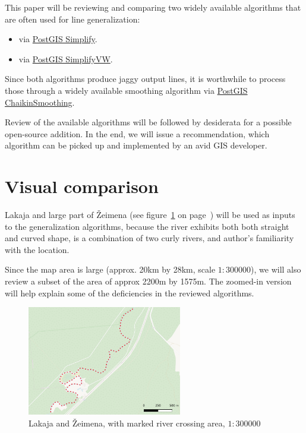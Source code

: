 \documentclass[a4paper]{article}
\begin{document}
This paper will be reviewing and comparing two widely available algorithms that
are often used for line generalization:
\begin{itemize}
    \item \cite{douglas1973algorithms} via
        \href{https://postgis.net/docs/ST_Simplify.html}{PostGIS Simplify}.

    \item \cite{visvalingam1993line} via
        \href{https://postgis.net/docs/ST_SimplifyVW.html}{PostGIS SimplifyVW}.

\end{itemize}

Since both algorithms produce jaggy output lines, it is worthwhile to process
those through a widely available \cite{chaikin1974algorithm} smoothing
algorithm via \href{https://postgis.net/docs/ST_ChaikinSmoothing.html}{PostGIS
ChaikinSmoothing}.

Review of the available algorithms will be followed by desiderata for a
possible open-source addition. In the end, we will issue a recommendation,
which algorithm can be picked up and implemented by an avid GIS developer.

\section{Visual comparison}

Lakaja and large part of Žeimena (see figure~\ref{fig:zeimena} on
page~\pageref{fig:zeimena}) will be used as inputs to the generalization
algorithms, because the river exhibits both both straight and curved shape, is
a combination of two curly rivers, and author's familiarity with the location.

Since the map area is large (approx. 20km by 28km, scale $1:300 000$), we will
also review a subset of the area of approx 2200m by 1575m. The zoomed-in
version will help explain some of the deficiencies in the reviewed algorithms.

\begin{figure}[H]
    \centering
    \includegraphics[width=67.5mm]{zeimena}
    \caption{Lakaja and Žeimena, with marked river crossing area, $1:300 000$}
    \label{fig:zeimena}
\end{figure}
\end{document}
